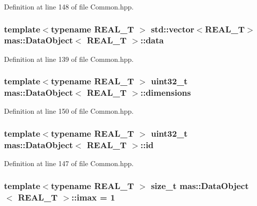 Definition at line 148 of file Common.\-hpp.

\hypertarget{structmas_1_1_data_object_afe358cb0a24648f460aab025b8d84cfa}{
\subsubsection[{data}]{\setlength{\rightskip}{0pt plus 5cm}template$<$typename R\-E\-A\-L\-\_\-\-T $>$ std\-::vector$<$R\-E\-A\-L\-\_\-\-T$>$ {\bf mas\-::\-Data\-Object}$<$ R\-E\-A\-L\-\_\-\-T $>$\-::data}}\label{structmas_1_1_data_object_afe358cb0a24648f460aab025b8d84cfa}


Definition at line 139 of file Common.\-hpp.

\hypertarget{structmas_1_1_data_object_af16f06b92cad5470eee7d190ec0ffac9}{
\subsubsection[{dimensions}]{\setlength{\rightskip}{0pt plus 5cm}template$<$typename R\-E\-A\-L\-\_\-\-T $>$ uint32\-\_\-t {\bf mas\-::\-Data\-Object}$<$ R\-E\-A\-L\-\_\-\-T $>$\-::dimensions}}\label{structmas_1_1_data_object_af16f06b92cad5470eee7d190ec0ffac9}


Definition at line 150 of file Common.\-hpp.

\hypertarget{structmas_1_1_data_object_abd3f89ad1237a3c419b2b9890f4236b2}{
\subsubsection[{id}]{\setlength{\rightskip}{0pt plus 5cm}template$<$typename R\-E\-A\-L\-\_\-\-T $>$ uint32\-\_\-t {\bf mas\-::\-Data\-Object}$<$ R\-E\-A\-L\-\_\-\-T $>$\-::id}}\label{structmas_1_1_data_object_abd3f89ad1237a3c419b2b9890f4236b2}


Definition at line 147 of file Common.\-hpp.

\hypertarget{structmas_1_1_data_object_a6249505c68ed35ad5e11c4cafd8eaa86}{
\subsubsection[{imax}]{\setlength{\rightskip}{0pt plus 5cm}template$<$typename R\-E\-A\-L\-\_\-\-T $>$ size\-\_\-t {\bf mas\-::\-Data\-Object}$<$ R\-E\-A\-L\-\_\-\-T $>$\-::imax = 1}}\label{structmas_1_1_data_object_a6249505c68ed35ad5e11c4cafd8eaa86}


